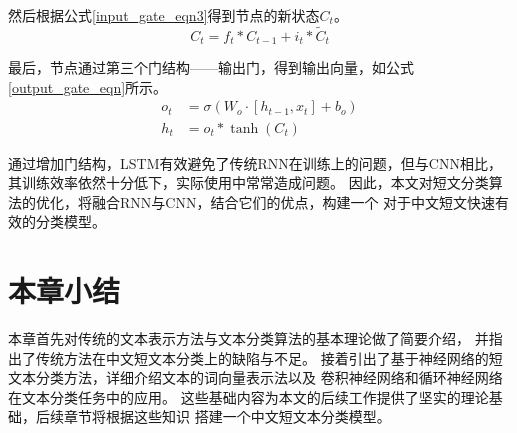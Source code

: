 然后根据公式\ref{input_gate_eqn3}得到节点的新状态$C_t$。
\begin{equation}
    C_t=f_t \ast C_{t-1} + i_t \ast \tilde{C}_t 
    \label{input_gate_eqn3}
\end{equation}

最后，节点通过第三个门结构——输出门，得到输出向量，如公式\ref{output_gate_eqn}所示。
\begin{equation}
    \begin{split}
        o_t&=\sigma\left ( W_o \cdot [h_{t-1},x_t]+b_o \right ) \\
        h_t &= o_t \ast \tanh\left ( C_t \right )
    \end{split}
    \label{output_gate_eqn}
\end{equation}

通过增加门结构，LSTM有效避免了传统RNN在训练上的问题，但与CNN相比，
其训练效率依然十分低下，实际使用中常常造成问题。
因此，本文对短文分类算法的优化，将融合RNN与CNN，结合它们的优点，构建一个
对于中文短文快速有效的分类模型。

\section{本章小结}
本章首先对传统的文本表示方法与文本分类算法的基本理论做了简要介绍，
并指出了传统方法在中文短文本分类上的缺陷与不足。
接着引出了基于神经网络的短文本分类方法，详细介绍文本的词向量表示法以及
卷积神经网络和循环神经网络在文本分类任务中的应用。
这些基础内容为本文的后续工作提供了坚实的理论基础，后续章节将根据这些知识
搭建一个中文短文本分类模型。